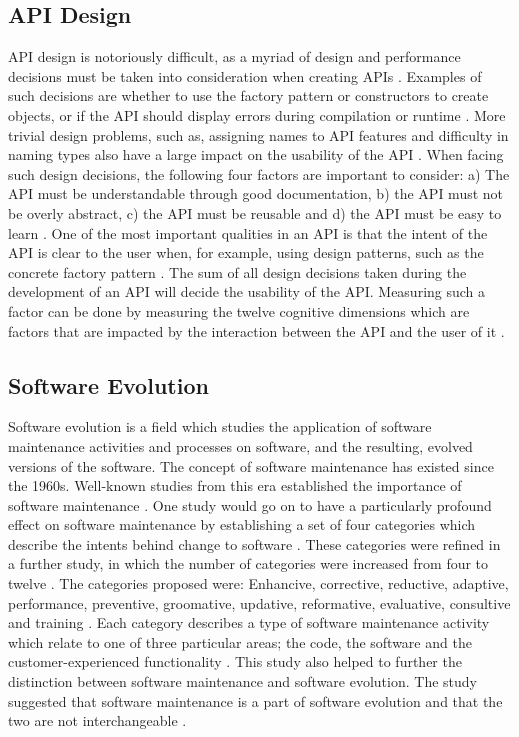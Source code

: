 \documentclass{sig-alternate}
\begin{document}
\subsection{API Design} \label{api_design}
API design is notoriously difficult, as a myriad of design and performance decisions must be taken into consideration when creating APIs \cite{stylos2006comparing} \cite{afonso2012evaluating} \cite{bloch2008effective}. Examples of such decisions are whether to use the factory pattern or constructors to create objects, or if the API should display errors during compilation or runtime \cite{stylos2006comparing}. More trivial design problems, such as, assigning names to API features and difficulty in naming types also have a large impact on the usability of the API \cite{shi2011empirical}. When facing such design decisions, the following four factors are important to consider: a) The API  must be understandable through good documentation, b) the API must not be overly abstract, c) the API must be reusable and d) the API must be easy to learn \cite{shi2011empirical}. One of the most important qualities in an API is that the intent of the API is clear to the user when, for example, using design patterns, such as the concrete factory pattern \cite{stylos2006comparing} \cite{shi2011empirical}. The sum of all design decisions taken during the development of an API will decide the usability of the API. Measuring such a factor can be done by measuring the twelve cognitive dimensions which are factors that are impacted by the interaction between the API and the user of it \cite{clarke2004measuring}. 


\subsection{Software Evolution} \label{software_evolution}
Software evolution is a field which studies the application of software maintenance activities and processes on software, and the resulting, evolved versions of the software. The concept of software maintenance has existed since the 1960s. Well-known studies from this era established the importance of software maintenance \cite{lientz1980software}. One study would go on to have a particularly profound effect on software maintenance by establishing a set of four categories which describe the intents behind change to software \cite{lientz1980software}. These categories were refined in a further study, in which the number of categories were increased from four to twelve \cite{chapin2001types}. The categories proposed were: Enhancive, corrective, reductive, adaptive, performance, preventive, groomative, updative, reformative, evaluative, consultive and training \cite{chapin2001types}. Each category describes a type of software maintenance activity which relate to one of three particular areas; the code, the software and the customer-experienced functionality \cite{chapin2001types}. This study also helped to further the distinction between software maintenance and software evolution. The study suggested that software maintenance is a part of software evolution and that the two are not interchangeable \cite{chapin2001types}. 
\end{document}
